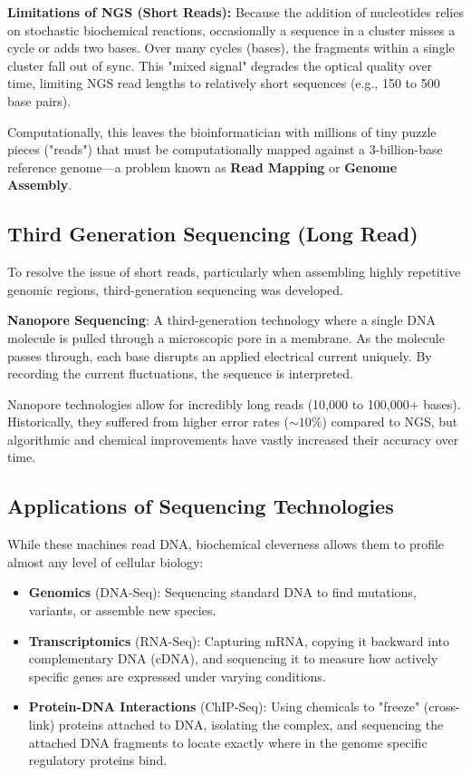 \documentclass[11pt, a4paper]{article}
\begin{document}
\textbf{Limitations of NGS (Short Reads):}
Because the addition of nucleotides relies on stochastic biochemical reactions, occasionally a sequence in a cluster misses a cycle or adds two bases. Over many cycles (bases), the fragments within a single cluster fall out of sync. This "mixed signal" degrades the optical quality over time, limiting NGS read lengths to relatively short sequences (e.g., 150 to 500 base pairs). 

Computationally, this leaves the bioinformatician with millions of tiny puzzle pieces ("reads") that must be computationally mapped against a 3-billion-base reference genome—a problem known as \textbf{Read Mapping} or \textbf{Genome Assembly}.

\subsection{Third Generation Sequencing (Long Read)}

To resolve the issue of short reads, particularly when assembling highly repetitive genomic regions, third-generation sequencing was developed. 

\begin{important}
    \textbf{Nanopore Sequencing}: A third-generation technology where a single DNA molecule is pulled through a microscopic pore in a membrane. As the molecule passes through, each base disrupts an applied electrical current uniquely. By recording the current fluctuations, the sequence is interpreted.
\end{important}

Nanopore technologies allow for incredibly long reads (10,000 to 100,000+ bases). Historically, they suffered from higher error rates (\(\sim 10\%\)) compared to NGS, but algorithmic and chemical improvements have vastly increased their accuracy over time.

\subsection{Applications of Sequencing Technologies}

While these machines read DNA, biochemical cleverness allows them to profile almost any level of cellular biology:
\begin{itemize}
    \item \textbf{Genomics} (DNA-Seq): Sequencing standard DNA to find mutations, variants, or assemble new species.
    \item \textbf{Transcriptomics} (RNA-Seq): Capturing mRNA, copying it backward into complementary DNA (cDNA), and sequencing it to measure how actively specific genes are expressed under varying conditions.
    \item \textbf{Protein-DNA Interactions} (ChIP-Seq): Using chemicals to "freeze" (cross-link) proteins attached to DNA, isolating the complex, and sequencing the attached DNA fragments to locate exactly where in the genome specific regulatory proteins bind.
\end{itemize}
\end{document}
